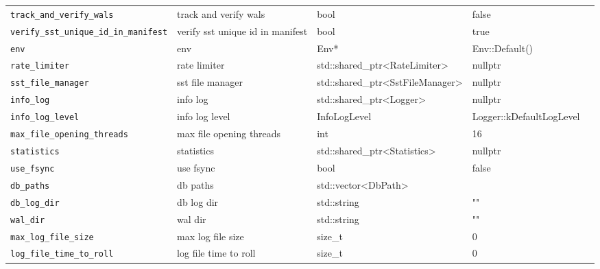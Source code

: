 {{\begin{longtable}{@{}p{3.4cm}p{5.0cm}p{3.6cm}p{2.5cm}p{2.6cm}@{}}
    \texttt{track\_and\_verify\_wals}
    & track and verify wals
    & bool
    & false
    & \\

    \texttt{verify\_sst\_unique\_id\_in\_manifest}
    & verify sst unique id in manifest
    & bool
    & true
    & \\

    \texttt{env}
    & env
    & Env*
    & Env::Default()
    & \\

    \texttt{rate\_limiter}
    & rate limiter
    & std::shared\_ptr\textless{}RateLimiter\textgreater{}
    & nullptr
    & \\

    \texttt{sst\_file\_manager}
    & sst file manager
    & std::shared\_ptr\textless{}SstFileManager\textgreater{}
    & nullptr
    & \\

    \texttt{info\_log}
    & info log
    & std::shared\_ptr\textless{}Logger\textgreater{}
    & nullptr
    & \\

    \texttt{info\_log\_level}
    & info log level
    & InfoLogLevel
    & Logger::kDefaultLogLevel
    & \\

    \texttt{max\_file\_opening\_threads}
    & max file opening threads
    & int
    & 16
    & \\

    \texttt{statistics}
    & statistics
    & std::shared\_ptr\textless{}Statistics\textgreater{}
    & nullptr
    & \\

    \texttt{use\_fsync}
    & use fsync
    & bool
    & false
    & \\

    \texttt{db\_paths}
    & db paths
    & std::vector\textless{}DbPath\textgreater{}
    & 
    & \\

    \texttt{db\_log\_dir}
    & db log dir
    & std::string
    & ""
    & \\

    \texttt{wal\_dir}
    & wal dir
    & std::string
    & ""
    & \\

    \texttt{max\_log\_file\_size}
    & max log file size
    & size\_t
    & 0
    & \\

    \texttt{log\_file\_time\_to\_roll}
    & log file time to roll
    & size\_t
    & 0
    & \\


\end{longtable}}}
